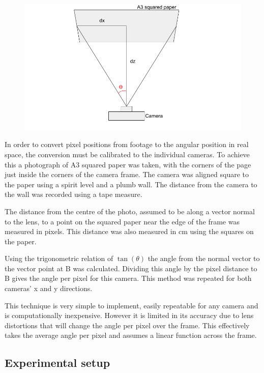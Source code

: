 \documentclass{article}
\begin{document}
\begin{figure}[h!]
\centering
\includegraphics[width=.4\textheight]{Camera_calibration.png}
\label{fig:calib}
\end{figure}

In order to convert pixel positions from footage to the angular position in real space, the conversion must be calibrated to the individual cameras. To achieve this a photograph of A3 squared paper was taken, with the corners of the page just inside the corners of the camera frame. The camera was aligned square to the paper using a spirit level and a plumb wall. The distance from the camera to the wall was recorded using a tape measure. 

The distance from the centre of the photo, assumed to be along a vector normal to the lens, to a point on the squared paper near the edge of the frame was measured in pixels. This distance was also measured in cm using the squares on the paper. 

Using the trigonometric relation of $\tan(\theta)$ the angle from the normal vector to the vector point at B was calculated. Dividing this angle by the pixel distance to B gives the angle per pixel for this camera. This method was repeated for both cameras’ x and y directions.

This technique is very simple to implement, easily repeatable for any camera and is computationally inexpensive. However it is limited in its accuracy due to lens distortions that will change the angle per pixel over the frame. This effectively takes the average angle per pixel and assumes a linear function across the frame.

\subsection{Experimental setup}
\end{document}
